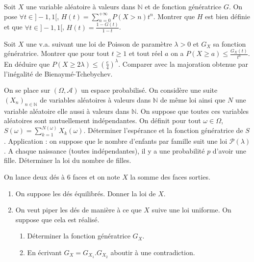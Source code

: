 \begin{exercice}
Soit $X$ une variable aléatoire à valeurs dans $\mathbb{N}$ et de fonction génératrice $G$. On pose $\forall t\in]-1,1[$, $H(t)=\sum_{n=0}^{+ \infty}P(X>n)t^{n}$.
Montrer que $H$ est bien définie et que $\forall t\in]-1,1[$, $H(t)=\frac{1-G(t)}{1-t}$.
\end{exercice}

\begin{exercice}
Soit $X$ une v.a. suivant une loi de Poisson de paramètre $\lambda>0$ et $G_{X}$ sa fonction génératrice.
Montrer que pour tout $t\ge1$ et tout réel $a$ on a $P(X\ge a)\le\frac{G_{X}(t)}{t^{a}}$.
En déduire que $P(X\ge2\lambda)\le(\frac{e}{4})^{\lambda}$.
Comparer avec la majoration obtenue par l'inégalité de Bienaymé-Tchebychev.
\end{exercice}

\begin{exercice}
On se place sur $(\Omega, \mathcal{A})$ un espace probabilisé. On considère une suite $(X_{n})_{n\in\mathbb{N}}$ de variables aléatoires à valeurs dans $\mathbb{N}$ de même loi ainsi que $N$ une variable aléatoire elle aussi à valeurs dans $\mathbb{N}$. On suppose que toutes ces variables aléatoires sont mutuellement indépendantes. On définit pour tout $\omega\in\Omega$, $S(\omega)=\sum_{k=1}^{N(\omega)}X_{k}(\omega)$.
Déterminer l'espérance et la fonction génératrice de $S$.
Application : on suppose que le nombre d'enfants par famille suit une loi $\mathcal{P}(\lambda)$. A chaque naissance (toutes indépendantes), il y a une probabilité $p$ d'avoir une fille. Déterminer la loi du nombre de filles.
\end{exercice}

\begin{exercice}
On lance deux dés à 6 faces et on note $X$ la somme des faces sorties.
\begin{enumerate}
    \item On suppose les dés équilibrés. Donner la loi de $X$.
    \item On veut piper les dés de manière à ce que $X$ suive une loi uniforme. On suppose que cela est réalisé.
    \begin{enumerate}
        \item Déterminer la fonction génératrice $G_{X}$.
        \item En écrivant $G_{X}=G_{X_{1}}.G_{X_{2}}$ aboutir à une contradiction.
    \end{enumerate}
\end{enumerate}
\end{exercice}

